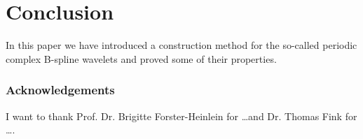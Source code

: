 \documentclass[12pt, class = report, crop = false, a4paper, twoside]{standalone}
\begin{document}
\chapter*{Conclusion}

In this paper we have introduced a construction method for the so-called periodic complex B-spline wavelets and proved some of their properties.

\subsection*{Acknowledgements}
I want to thank Prof. Dr. Brigitte Forster-Heinlein for \dots and Dr. Thomas Fink for \dots.
\end{document}
